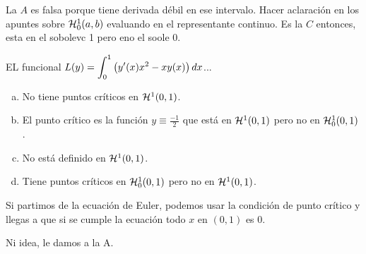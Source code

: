 La $A$ es falsa porque tiene derivada débil en ese intervalo. Hacer aclaración en los apuntes sobre $\sobolevcero{1}$ evaluando en el representante continuo. Es la $C$ entonces, esta en el sobolevc 1 pero eno el soole 0.

\begin{ejercicio}
EL funcional $L(y)=\integral{0}{1}{\left(y'(x)x^2-xy(x)\right)dx}$...
\begin{enumerate}[(a)]
\item No tiene puntos críticos en $\sobolev[0,1]{1}$.
\item El punto crítico es la función $y\equiv\frac{-1}{2}$ que está en $\sobolev[0,1]{1}$ pero no en $\sobolevcero[0,1]{1}$.
\item No está definido en $\sobolev[0,1]{1}$.
\item Tiene puntos críticos en $\sobolevcero[0,1]{1}$ pero no en $\sobolev[0,1]{1}$.
\end{enumerate}
\end{ejercicio}

Si partimos de la ecuación de Euler, podemos usar la condición de punto crítico y llegas a que si se cumple la ecuación todo $x$ en $(0,1)$ es 0.

Ni idea, le damos a la A.